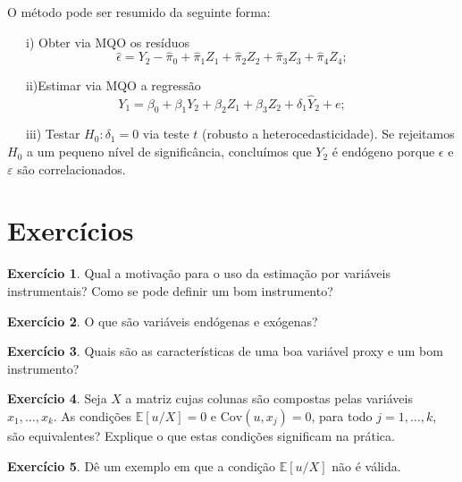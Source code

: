 \documentclass[
]{book}
\theoremstyle{definition}
\theoremstyle{definition}
\theoremstyle{definition}
\newtheorem{exercise}{Exercício}[chapter]
\theoremstyle{remark}
\begin{document}
O método pode ser resumido da seguinte forma:

~~~i) Obter via MQO os resíduos \[\hat\epsilon=Y_2-\hat{\pi}_0+\hat{\pi}_1Z_1+\hat{\pi}_2Z_2+\hat{\pi}_3Z_3+\hat{\pi}_4Z_4;\]

~~~ii)Estimar via MQO a regressão \begin{equation*}        Y_1=\beta_0+\beta_1Y_2+\beta_2Z_1+\beta_3Z_2+\delta_1\hat{Y}_2+e;       \end{equation*}

~~~iii) Testar \(H_0:\delta_1=0\) via teste \(t\) (robusto a heterocedasticidade). Se rejeitamos \(H_0\) a um pequeno nível de significância, concluímos que \(Y_2\) é endógeno porque \(\epsilon\) e \(\varepsilon\) são correlacionados.

\newpage

\hypertarget{exercuxedcios}{%
\section{Exercícios}\label{exercuxedcios}}

\begin{exercise}
\protect\hypertarget{exr:exvi1}{}{\label{exr:exvi1} }Qual a motivação para o uso da estimação por variáveis instrumentais? Como se pode definir um bom instrumento?
\end{exercise}

\begin{exercise}
\protect\hypertarget{exr:exvi2}{}{\label{exr:exvi2} }O que são variáveis endógenas e exógenas?
\end{exercise}

\begin{exercise}
\protect\hypertarget{exr:exvi3}{}{\label{exr:exvi3} }Quais são as características de uma boa variável proxy e um bom instrumento?
\end{exercise}

\begin{exercise}
\protect\hypertarget{exr:exvi4}{}{\label{exr:exvi4} }Seja \(X\) a matriz cujas colunas são compostas pelas variáveis \(x_1,\ldots,x_k\). As condições \(\mathbb{E}[u/X]=0\) e \(\mbox{Cov}(u,x_j)=0\), para todo \(j=1,\ldots,k\), são equivalentes? Explique o que estas condições significam na prática.
\end{exercise}

\begin{exercise}
\protect\hypertarget{exr:exvi5}{}{\label{exr:exvi5} }Dê um exemplo em que a condição \(\mathbb{E}[u/X]\) não é válida.
\end{exercise}
\end{document}

